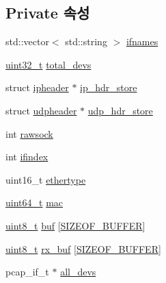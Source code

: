 \subsection*{Private 속성}
\begin{DoxyCompactItemize}
\item 
std\+::vector$<$ std\+::string $>$ \hyperlink{classavdecc__lib_1_1net__interface__imp_a00031dfb5f1a1ca3fc12dd11b601030a}{ifnames}
\item 
\hyperlink{parse_8c_a6eb1e68cc391dd753bc8ce896dbb8315}{uint32\+\_\+t} \hyperlink{classavdecc__lib_1_1net__interface__imp_af5bfb72dc07c53253d70d1879054af6b}{total\+\_\+devs}
\item 
struct \hyperlink{structavdecc__lib_1_1ipheader}{ipheader} $\ast$ \hyperlink{classavdecc__lib_1_1net__interface__imp_a81b4fd9a03787b74d75e40b6c673e187}{ip\+\_\+hdr\+\_\+store}
\item 
struct \hyperlink{structavdecc__lib_1_1udpheader}{udpheader} $\ast$ \hyperlink{classavdecc__lib_1_1net__interface__imp_a65cb4a1c57b7723f14a70a7a741c8160}{udp\+\_\+hdr\+\_\+store}
\item 
int \hyperlink{classavdecc__lib_1_1net__interface__imp_a9a1008a3b40e75b22aa5d7945cbf2918}{rawsock}
\item 
int \hyperlink{classavdecc__lib_1_1net__interface__imp_a01e636f8746c84f1cf3d45c4afbfde35}{ifindex}
\item 
uint16\+\_\+t \hyperlink{classavdecc__lib_1_1net__interface__imp_aa9296c58dc24c63c4ee927db394a97d7}{ethertype}
\item 
\hyperlink{parse_8c_aec6fcb673ff035718c238c8c9d544c47}{uint64\+\_\+t} \hyperlink{classavdecc__lib_1_1net__interface__imp_a920661745231ffa48515d83a8953e76f}{mac}
\item 
\hyperlink{stdint_8h_aba7bc1797add20fe3efdf37ced1182c5}{uint8\+\_\+t} \hyperlink{classavdecc__lib_1_1net__interface__imp_a2fcf0f59a3bdd4bb28efcf457030232d}{buf} \mbox{[}\hyperlink{classavdecc__lib_1_1net__interface__imp_a3e5c1b25e81a93c89394dd173bbb10d1aadb2883217eeaa3ca184df5701754339}{S\+I\+Z\+E\+O\+F\+\_\+\+B\+U\+F\+F\+ER}\mbox{]}
\item 
\hyperlink{stdint_8h_aba7bc1797add20fe3efdf37ced1182c5}{uint8\+\_\+t} \hyperlink{classavdecc__lib_1_1net__interface__imp_a48f1e2eeb3d4eed351c84294149cae4f}{rx\+\_\+buf} \mbox{[}\hyperlink{classavdecc__lib_1_1net__interface__imp_a3e5c1b25e81a93c89394dd173bbb10d1aadb2883217eeaa3ca184df5701754339}{S\+I\+Z\+E\+O\+F\+\_\+\+B\+U\+F\+F\+ER}\mbox{]}
\item 
pcap\+\_\+if\+\_\+t $\ast$ \hyperlink{classavdecc__lib_1_1net__interface__imp_a7fd095d711676d36f88602090de68d8c}{all\+\_\+devs}

\end{DoxyCompactItemize}
